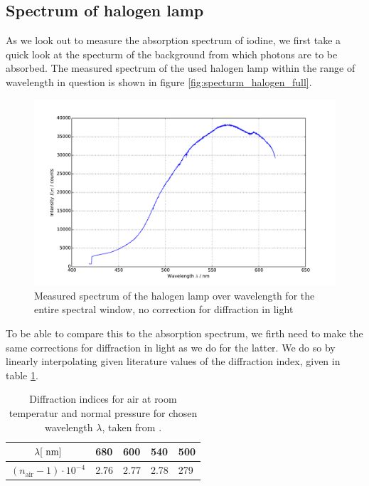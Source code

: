 \subsection{Spectrum of halogen lamp}
As we look out to measure the absorption spectrum of iodine, we first take a quick look at 
the specturm of the background from which photons are to be absorbed. The measured spectrum 
of the used halogen lamp within the range of wavelength in question is shown in figure 
\ref{fig:specturm_halogen_full}.
\begin{figure}
\centering
\includegraphics[width=\pltw]{analysis/figures/halogen_02.pdf}
\caption{Measured spectrum of the halogen lamp over wavelength 
for the entire spectral window, 
no correction for diffraction in light}
\label{fig:spectrum_halogen_full}
\end{figure}
To be able to compare this to the absorption spectrum, we firth need to make the same 
corrections for diffraction in light as we do for the latter. We do so by linearly 
interpolating given literature values of the diffraction index, given in table 
\ref{tab:diff_air}.

\begin{table}[h]
\centering
\begin{tabular}{| c |l|l|l|l|}
\hline
$\lambda [\ \mathrm{nm}]$              & 680  & 600  & 540  & 500 \\ \hline
$(n_\mathrm{air} - 1) \cdot 10^{-4}$ & 2.76 & 2.77 & 2.78 & 279 \\ \hline
\end{tabular}
\caption{Diffraction indices for air at room temperatur and normal pressure for 
chosen wavelength $\lambda$, taken from \cite{staatsexamen}.}
\label{tab:diff_air}
\end{table}

